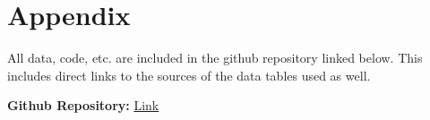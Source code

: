 \section*{Appendix}

All data, code, etc. are included in the github repository linked below. This includes direct links to the sources of the data tables used as well.

\noindent\textbf{Github Repository:} \href{https://github.com/blamson/mth-5387-regression-project}{Link}